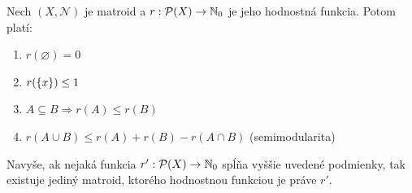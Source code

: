 \begin{theorem}
\label{th:m_r}
Nech $(X, \mathcal{N})$ je matroid a $r:\mathcal{P}(X) \to \mathbb{N}_0$ je jeho hodnostná funkcia. Potom platí:
\begin{enumerate}
    \item $r(\varnothing) = 0$
    \item $r(\left\{x\right\}) \leq 1$
    \item $A \subseteq B \Longrightarrow r(A) \leq r(B)$
    \item $r(A \cup B) \leq r(A) + r(B) - r(A \cap B)$ (semimodularita)
\end{enumerate}

Navyše, ak nejaká funkcia $r':\mathcal{P}(X)\to\mathbb{N}_0$ spĺňa vyššie uvedené podmienky, tak existuje jediný matroid, ktorého
hodnostnou funkciou je práve $r'$.
\end{theorem}
